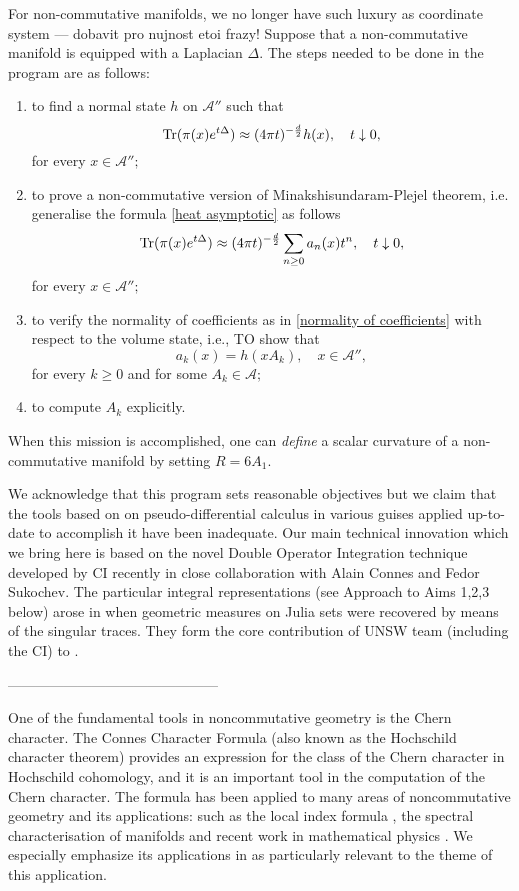 \documentclass{article}
\begin{document}
For non-commutative manifolds, we no longer have such luxury as coordinate system --- dobavit pro nujnost etoi frazy! Suppose that a non-commutative manifold is equipped with a Laplacian $\Delta.$ The steps needed to be done in the program are as follows:
\begin{enumerate}
\item\label{raph1} to find a normal state $h$ on $\mathcal{A}''$ such that
\begin{equation}\label{raph1 eq}
{\rm Tr}(\pi(x)e^{t\Delta})\approx (4\pi t)^{-\frac{d}{2}} h(x),\quad t\downarrow0,
\end{equation}
for every $x\in\mathcal{A}'';$
\item\label{raph2} to prove a non-commutative version of Minakshisundaram-Plejel theorem, i.e. generalise the formula \eqref{heat asymptotic} as follows
$${\rm Tr}(\pi(x)e^{t\Delta})\approx (4\pi t)^{-\frac{d}{2}} \sum_{n\geq0}a_n(x)t^n,\quad t\downarrow0,$$
for every $x\in\mathcal{A}'';$
\item\label{raph3} to verify the normality of coefficients as in \eqref{normality of coefficients} with respect to the volume state, i.e., TO show that
$$a_k(x)=h(xA_k),\quad x\in\mathcal{A}'',$$
for every $k\geq0$ and for some $A_k\in\mathcal{A};$ 
\item\label{raph4} to compute $A_k$ explicitly.
\end{enumerate}
When this mission is accomplished, one can {\it define} a scalar curvature of a non-commutative manifold by setting $R=6A_1.$

We acknowledge that this program sets reasonable objectives but we claim that the tools based on on pseudo-differential calculus in various guises applied up-to-date to accomplish it have been inadequate. Our main technical innovation which we bring here  is based on the novel Double Operator Integration technique developed by CI recently in close collaboration with Alain Connes and Fedor Sukochev. The particular integral representations (see Approach to Aims 1,2,3 below) arose in \cite{Connes_team} when geometric measures on Julia sets were recovered by means of the singular traces. They form the core contribution of UNSW team (including the CI) to \cite{Connes_team}.



---------------------------------------------


One of the fundamental tools in noncommutative geometry is the Chern character. The Connes Character Formula (also known as the Hochschild character theorem) provides an expression for the class of the Chern character in Hochschild cohomology, and it is an important    tool in the computation of the Chern character. The formula has been applied to many areas     of noncommutative geometry and its applications: such as the local index formula \cite{ConnesMoscovici}, the spectral characterisation of manifolds \cite{Connes-reconstruction} and recent work in mathematical physics \cite{Connes-Chamseddine-Mukhanov-quanta-of-geometry-2015}. We especially emphasize its applications in \cite{Connes-reconstruction} as particularly relevant to the theme of this application.
\end{document}
